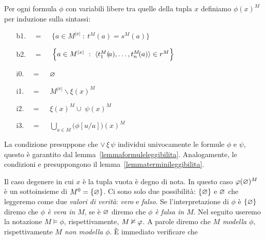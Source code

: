\begin{definition}\label{defverita} Per ogni formula $\phi$ con variabili libere tra quelle della tupla $x$ definiamo \emph{$\phi(x)^M$\/} per induzione sulla sintassi:
\begin{itemize}
\item[b1.] \hspace*{15ex}\ \  =\ \ \  $\Big\{a\in M^{|x|}\ :\ t^M\!(a)=s^M\!(a) \Big\}$\medskip

\item[b2.] \hspace*{15ex}\ \   =\ \ \ $\Big\{a\in M^{|x|}\ :\ \<t_1^M(\!a),\dots,t_n^M\!(a)\>\in r^M\Big\}$\medskip

\item[i0.] \hspace*{15ex}\ \  =\ \ \  $\varnothing$\bigskip

\item[i1.] \hspace*{15ex}\ \   =\ \ \  $M^{|x|}\smallsetminus\xi(x)^M$\bigskip

\item[i2.] \hspace*{15ex}\ \   =\ \ \  $\xi(x)^M\cup\;\psi(x)^M$\bigskip

\item[i3.] \hspace*{15ex}\ \   =\ \ \ $\displaystyle\bigcup_{a\in M}\big(\phi[u/a]\big)(x)^M$
\end{itemize}
La condizione  presuppone che  $\vee\,\xi\,\psi$ individui univocamente le formule $\phi$ e $\psi$, questo \`e garantito dal lemma~\ref{lemmaformuleleggibilita}. Analogamente, le condizioni  e  presuppongono il lemma~\ref{lemmaterminileggibilita}. 
\end{definition}


Il caso degenere in cui $x$ \`e la tupla vuota \`e degno di nota. In questo caso $\varphi(\varnothing)^M$ \`e un sottoinsieme di $M^0=\{\varnothing\}$. Ci sono solo due possibilit\`a: $\{\varnothing\}$ e $\varnothing$ che leggeremo come due \emph{valori di verit\`a}: \emph{vero\/} e \emph{falso}. Se l'interpretazione di $\phi$ \`e $\{\varnothing\}$ diremo che \emph{$\phi$ \`e vera in $M$}, se \`e $\varnothing$ diremo che \emph{$\phi$ \`e falsa in $M$}. Nel seguito useremo la notazione \emph{$M\models\phi$}, rispettivamente, \emph{$M\nvDash\varphi$}. A parole diremo che \emph{$M$ modella $\phi$}, rispettivamente \emph{$M$ non modella $\phi$}. \`E immediato verificare che 

